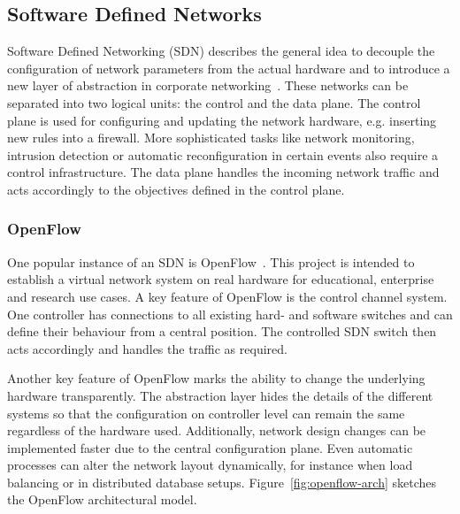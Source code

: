 \documentclass[a4paper,
		12pt,
		parskip=full,
		titlepage
		]{scrartcl}
\begin{document}
\subsection{Software Defined Networks}
\label{sec:SDN}
Software Defined Networking (SDN) describes the general idea to decouple 
the configuration of network parameters from the actual hardware and to 
introduce a new layer of abstraction in corporate networking~\cite{onf_whitepaper}.
These networks can be separated into two logical units: the control and the data plane.
The control plane is used for configuring and updating the network hardware, e.g. inserting new rules into a firewall.
More sophisticated tasks like network monitoring, intrusion detection or 
automatic reconfiguration in certain events also require a control infrastructure.
The data plane handles the incoming network traffic and acts accordingly to the objectives defined in the control plane.

\subsubsection{OpenFlow}
One popular instance of an SDN is OpenFlow~\cite{openflow_spec10}.
This project is intended to establish a virtual network system on real hardware 
for educational, enterprise and research use cases.
A key feature of OpenFlow is the control channel system.
One controller has connections to all existing hard- and software switches and can define their behaviour from a central position.
The controlled SDN switch then acts accordingly and handles the traffic as required.

Another key feature of OpenFlow marks the ability to change the underlying hardware transparently.
The abstraction layer hides the details of the different systems so that 
the configuration on controller level can remain the same regardless of the hardware used.
Additionally, network design changes can be implemented faster due to the central configuration plane.
Even automatic processes can alter the network layout dynamically, for instance when load balancing 
or in distributed database setups.
Figure~\ref{fig:openflow-arch} sketches the  OpenFlow architectural model.
\end{document}

